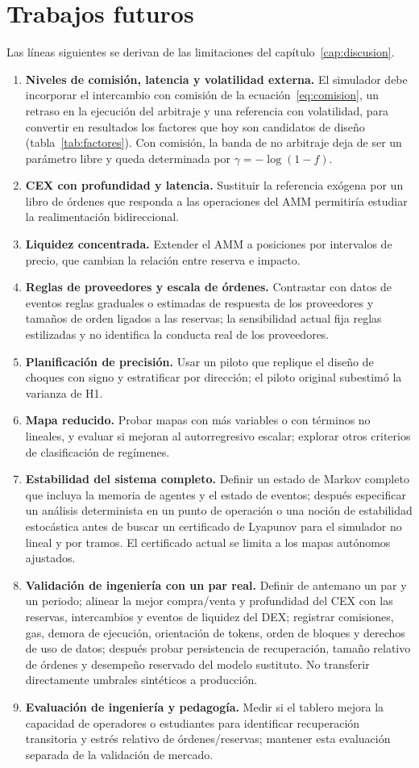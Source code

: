 \chapter{Trabajos futuros}
\label{cap:futuro}

Las líneas siguientes se derivan de las limitaciones del capítulo~\ref{cap:discusion}.

\begin{enumerate}
  \item \textbf{Niveles de comisión, latencia y volatilidad externa.} El simulador debe incorporar el intercambio con comisión de la ecuación~\eqref{eq:comision}, un retraso en la ejecución del arbitraje y una referencia con volatilidad, para convertir en resultados los factores que hoy son candidatos de diseño (tabla~\ref{tab:factores}). Con comisión, la banda de no arbitraje deja de ser un parámetro libre y queda determinada por $\gamma=-\log(1-f)$.
  \item \textbf{CEX con profundidad y latencia.} Sustituir la referencia exógena por un libro de órdenes que responda a las operaciones del AMM permitiría estudiar la realimentación bidireccional.
  \item \textbf{Liquidez concentrada.} Extender el AMM a posiciones por intervalos de precio, que cambian la relación entre reserva e impacto.
  \item \textbf{Reglas de proveedores y escala de órdenes.} Contrastar con datos de eventos reglas graduales o estimadas de respuesta de los proveedores y tamaños de orden ligados a las reservas; la sensibilidad actual fija reglas estilizadas y no identifica la conducta real de los proveedores.
  \item \textbf{Planificación de precisión.} Usar un piloto que replique el diseño de choques con signo y estratificar por dirección; el piloto original subestimó la varianza de H1.
  \item \textbf{Mapa reducido.} Probar mapas con más variables o con términos no lineales, y evaluar si mejoran al autorregresivo escalar; explorar otros criterios de clasificación de regímenes.
  \item \textbf{Estabilidad del sistema completo.} Definir un estado de Markov completo que incluya la memoria de agentes y el estado de eventos; después especificar un análisis determinista en un punto de operación o una noción de estabilidad estocástica antes de buscar un certificado de Lyapunov para el simulador no lineal y por tramos. El certificado actual se limita a los mapas autónomos ajustados.
  \item \textbf{Validación de ingeniería con un par real.} Definir de antemano un par y un periodo; alinear la mejor compra/venta y profundidad del CEX con las reservas, intercambios y eventos de liquidez del DEX; registrar comisiones, gas, demora de ejecución, orientación de tokens, orden de bloques y derechos de uso de datos; después probar persistencia de recuperación, tamaño relativo de órdenes y desempeño reservado del modelo sustituto. No transferir directamente umbrales sintéticos a producción.
  \item \textbf{Evaluación de ingeniería y pedagogía.} Medir si el tablero mejora la capacidad de operadores o estudiantes para identificar recuperación transitoria y estrés relativo de órdenes/reservas; mantener esta evaluación separada de la validación de mercado.
\end{enumerate}
